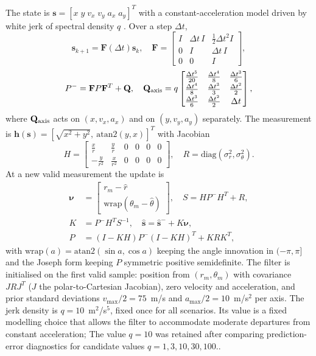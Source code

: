 \documentclass[conference]{IEEEtran}
\newcommand{\vect}[1]{\mathbf{#1}}
\begin{document}
The state is $\vect s=[x\;y\;v_x\;v_y\;a_x\;a_y]^T$ with a constant-acceleration model driven by white jerk of spectral density $q$ \cite{bs}. Over a step $\Delta t$,
\begin{equation}
\vect s_{k+1}=\vect F(\Delta t)\vect s_k,\quad
\vect F=\begin{bmatrix}I&\Delta t\,I&\tfrac12\Delta t^2I\\0&I&\Delta t\,I\\0&0&I\end{bmatrix},
\label{eq:F}
\end{equation}
\begin{equation}
P^-=\vect FP\vect F^T+\vect Q,\quad
\vect Q_{\rm axis}=q\begin{bmatrix}\frac{\Delta t^5}{20}&\frac{\Delta t^4}{8}&\frac{\Delta t^3}{6}\\[1pt]\frac{\Delta t^4}{8}&\frac{\Delta t^3}{3}&\frac{\Delta t^2}{2}\\[1pt]\frac{\Delta t^3}{6}&\frac{\Delta t^2}{2}&\Delta t\end{bmatrix},
\end{equation}
where $\vect Q_{\rm axis}$ acts on $(x,v_x,a_x)$ and on $(y,v_y,a_y)$ separately. The measurement is $\vect h(\vect s)=[\sqrt{x^2+y^2},\ \mathrm{atan2}(y,x)]^T$ with Jacobian
\begin{equation}
H=\begin{bmatrix}\frac{x}{r}&\frac{y}{r}&0&0&0&0\\[1pt]-\frac{y}{r^2}&\frac{x}{r^2}&0&0&0&0\end{bmatrix},\quad R=\mathrm{diag}(\sigma_r^2,\sigma_\theta^2).
\end{equation}
At a new valid measurement the update is
\begin{align}
\vect\nu&=\begin{bmatrix}r_m-\hat r\\ \mathrm{wrap}(\theta_m-\hat\theta)\end{bmatrix},\quad S=HP^-H^T+R,\nonumber\\
K&=P^-H^TS^{-1},\quad \hat{\vect s}=\hat{\vect s}^-+K\vect\nu,\\
P&=(I-KH)P^-(I-KH)^T+KRK^T,\nonumber
\end{align}
with $\mathrm{wrap}(a)=\mathrm{atan2}(\sin a,\cos a)$ keeping the angle innovation in $(-\pi,\pi]$ and the Joseph form keeping $P$ symmetric positive semidefinite. The filter is initialised on the first valid sample: position from $(r_m,\theta_m)$ with covariance $JRJ^T$ ($J$ the polar-to-Cartesian Jacobian), zero velocity and acceleration, and prior standard deviations $v_{\max}/2=75$~m/s and $a_{\max}/2=10$~m/s$^2$ per axis. The jerk density is $q=10$~m$^2$/s$^5$, fixed once for all scenarios. Its value is a fixed modelling choice that allows the filter to accommodate moderate departures from constant acceleration; The value $q=10$ was retained after comparing prediction-error
diagnostics for candidate values $q=1,3,10,30,100$..
\end{document}
